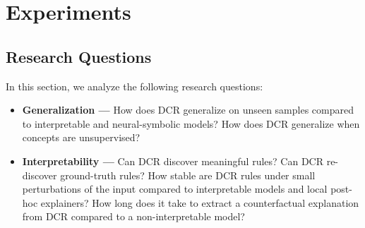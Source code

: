 




\section{Experiments}
\label{sec:dcr-exp}

\subsection{Research Questions}
In this section, we analyze the following research questions:
\begin{itemize}
    \item \textbf{Generalization ---} How does DCR generalize on unseen samples compared to interpretable and neural-symbolic models? How does DCR generalize when concepts are unsupervised?
    \item \textbf{Interpretability ---} Can DCR discover meaningful rules? Can DCR re-discover ground-truth rules? How stable are DCR rules under small perturbations of the input compared to interpretable models and local post-hoc explainers?
    How long does it take to extract a counterfactual explanation from DCR compared to a non-interpretable model?
\end{itemize}


